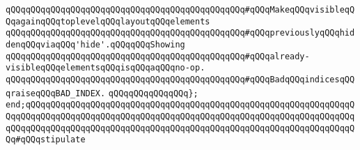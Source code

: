 \verb|qQQqqQQqqQQqqQQqqQQqqQQqqQQqqQQqqQQqqQQqqQQqqQQq#qQQqMakeqQQqvisibleqQQqagainqQQqtoplevelqQQqlayoutqQQqelements|\newline
\verb|qQQqqQQqqQQqqQQqqQQqqQQqqQQqqQQqqQQqqQQqqQQqqQQq#qQQqpreviouslyqQQqhiddenqQQqviaqQQq'hide'.qQQqqQQqShowing|\newline
\verb|qQQqqQQqqQQqqQQqqQQqqQQqqQQqqQQqqQQqqQQqqQQqqQQq#qQQqalready-visibleqQQqelementsqQQqisqQQqaqQQqno-op.|\newline
\verb|qQQqqQQqqQQqqQQqqQQqqQQqqQQqqQQqqQQqqQQqqQQqqQQq#qQQqBadqQQqindicesqQQqraiseqQQqBAD_INDEX.|\newline
\verb|qQQqqQQqqQQqqQQq};|\newline
\newline
\verb|end;qQQqqQQqqQQqqQQqqQQqqQQqqQQqqQQqqQQqqQQqqQQqqQQqqQQqqQQqqQQqqQQqqQQqqQQqqQQqqQQqqQQqqQQqqQQqqQQqqQQqqQQqqQQqqQQqqQQqqQQqqQQqqQQqqQQqqQQqqQQqqQQqqQQqqQQqqQQqqQQqqQQqqQQqqQQqqQQqqQQqqQQqqQQqqQQqqQQqqQQqqQQqqQQq#qQQqstipulate|\newline
\newline
\newline

